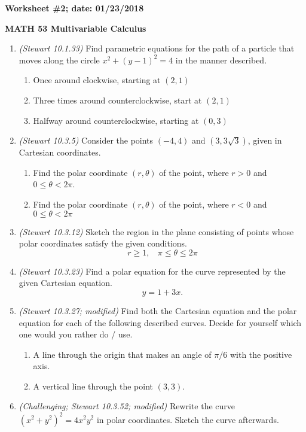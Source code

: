 \documentclass{article}
\begin{document}
{\bf Worksheet \#2; date: 01/23/2018}

{\bf MATH 53 Multivariable Calculus}

\begin{enumerate}
\item {\em (Stewart 10.1.33)} Find parametric equations for the path of a particle that moves along the circle $x^2 + (y - 1)^2 = 4$ in the manner described.
\begin{enumerate}
\item Once around clockwise, starting at $(2, 1)$
\item Three times around counterclockwise, start at $(2, 1)$
\item Halfway around counterclockwise, starting at $(0, 3)$
\end{enumerate}

\item {\em (Stewart 10.3.5)} Consider the points $(-4, 4)$ and $(3, 3 \sqrt{3})$, given in Cartesian coordinates.
\begin{enumerate}
\item Find the polar coordinate $(r, \theta)$ of the point, where $r > 0$ and $0 \le \theta < 2\pi$.
\item Find the polar coordinate $(r, \theta)$ of the point, where $r < 0$ and $0 \le \theta < 2\pi$
\end{enumerate}

\item {\em (Stewart 10.3.12)} Sketch the region in the plane consisting of points whose polar coordinates satisfy the given conditions.
\[
r \ge 1, ~~~~ \pi \le \theta \le 2\pi
\]

\item {\em (Stewart 10.3.23)} Find a polar equation for the curve represented by the given Cartesian equation.
\[
y = 1 + 3x.
\]

\item {\em (Stewart 10.3.27; modified)} Find both the Cartesian equation and the polar equation for each of the following described curves. Decide for yourself which one would you rather do / use.
\begin{enumerate}
\item A line through the origin that makes an angle of $\pi / 6$ with the positive axis.
\item A vertical line through the point $(3, 3)$.
\end{enumerate}

\item {\em (Challenging; Stewart 10.3.52; modified)} Rewrite the curve $(x^2 + y^2)^2 = 4 x^2 y^2$ in polar coordinates. Sketch the curve afterwards.


\end{enumerate}
\end{document}
